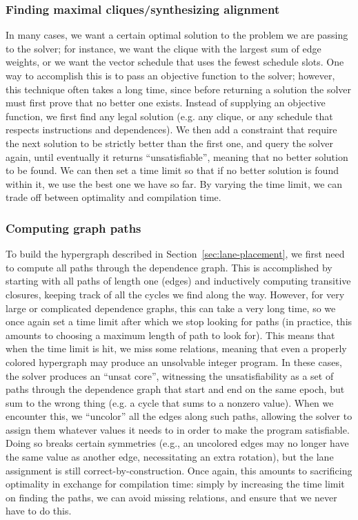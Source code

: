 \subsubsection*{Finding maximal cliques/synthesizing alignment}\label{sec:iterative-synthesis}
In many cases, we want a certain optimal solution to the problem we are passing to the solver; for instance, we want the clique with the largest sum of edge weights, or we want the vector schedule that uses the fewest schedule slots.
One way to accomplish this is to pass an objective function to the solver; however, this technique often takes a long time, since before returning a solution the solver must first prove that no better one exists.
Instead of supplying an objective function, we first find any legal solution (e.g. any clique, or any schedule that respects instructions and dependences).
We then add a constraint that require the next solution to be strictly better than the first one, and query the solver again, until eventually it returns ``unsatisfiable'', meaning that no better solution to be found.
We can then set a time limit so that if no better solution is found within it, we use the best one we have so far.
By varying the time limit, we can trade off between optimality and compilation time.

\subsubsection*{Computing graph paths}\label{sec:computing-graph-paths}
To build the hypergraph described in Section~\ref{sec:lane-placement}, we first need to compute all paths through the dependence graph.
This is accomplished by starting with all paths of length one (edges) and inductively computing transitive closures, keeping track of all the cycles we find along the way.
However, for very large or complicated dependence graphs, this can take a very long time, so we once again set a time limit after which we stop looking for paths (in practice, this amounts to choosing a maximum length of path to look for).
This means that when the time limit is hit, we miss some relations, meaning that even a properly colored hypergraph may produce an unsolvable integer program.
In these cases, the solver produces an ``unsat core'', witnessing the unsatisfiability as a set of paths through the dependence graph that start and end on the same epoch, but sum to the wrong thing (e.g. a cycle that sums to a nonzero value).
When we encounter this, we ``uncolor'' all the edges along such paths, allowing the solver to assign them whatever values it needs to in order to make the program satisfiable.
Doing so breaks certain symmetries (e.g., an uncolored edges may no longer have the same value as another edge, necessitating an extra rotation), but the lane assignment is still correct-by-construction.
Once again, this amounts to sacrificing optimality in exchange for compilation time: simply by increasing the time limit on finding the paths, we can avoid missing relations, and ensure that we never have to do this.

